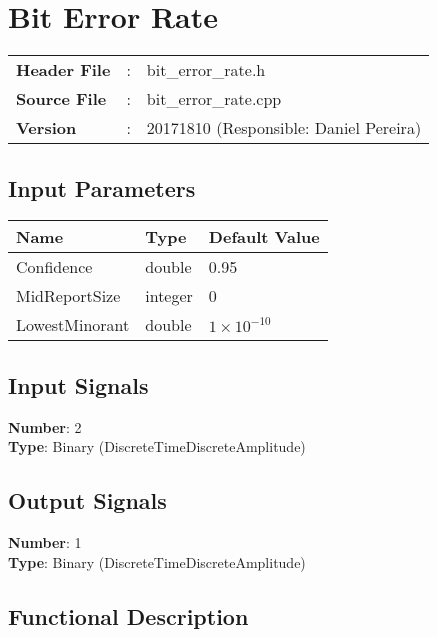 \clearpage

\section{Bit Error Rate}

\begin{tcolorbox}	
\begin{tabular}{p{2.75cm} p{0.2cm} p{10.5cm}} 	
\textbf{Header File}   &:& bit\_error\_rate.h \\
\textbf{Source File}   &:& bit\_error\_rate.cpp \\
\textbf{Version}       &:& 20171810 (Responsible: Daniel Pereira)
\end{tabular}
\end{tcolorbox}

\subsection*{Input Parameters}

\begin{table}[H]
\centering
\begin{tabular}{|l|l|l|}
\hline
Name           & Type    & Default Value     \\ \hline
Confidence     & double  & 0.95              \\ \hline
MidReportSize  & integer & 0                 \\ \hline
LowestMinorant & double  & $1\times10^{-10}$ \\ \hline
\end{tabular}
\end{table}

\subsection*{Input Signals}

\textbf{Number}: 2\\
\textbf{Type}: Binary (DiscreteTimeDiscreteAmplitude)

\subsection*{Output Signals}

\textbf{Number}: 1\\
\textbf{Type}: Binary (DiscreteTimeDiscreteAmplitude)

\subsection*{Functional Description}

